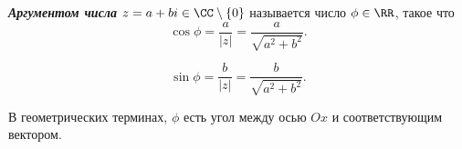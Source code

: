 \begin{definition}
    \textbf{\textit{Аргументом числа}} $z = a + bi \in \CC \setminus \{0\}$ называется число $\phi \in \RR$, такое что
    \begin{equation*}
        \cos \phi = \frac{a}{|z|} = \frac{a} {\sqrt{a^2 + b^2}}.
    \end{equation*}

    \begin{equation*}
        \sin \phi = \frac{b}{|z|} = \frac{b}{\sqrt{a^2 + b^2}}.
    \end{equation*}

    В геометрических терминах, $\phi$ есть угол между осью $Ox$ и соответствующим вектором.
\end{definition}
